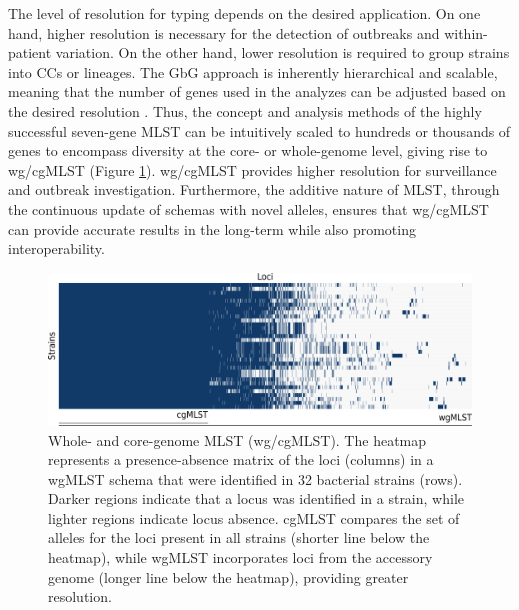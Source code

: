 The level of resolution for typing depends on the desired application. On one hand, higher resolution is necessary for the detection of outbreaks and within-patient variation. On the other hand, lower resolution is required to group strains into \ac{CC}s or lineages. The \ac{GbG} approach is inherently hierarchical and scalable, meaning that the number of genes used in the analyzes can be adjusted based on the desired resolution \cite{maiden_mlst_2013}. Thus, the concept and analysis methods of the highly successful seven-gene \ac{MLST} can be intuitively scaled to hundreds or thousands of genes to encompass diversity at the core- or whole-genome level, giving rise to \ac{wg/cgMLST} (Figure \ref{fig:introduction_figure8}). \ac{wg/cgMLST} provides higher resolution for surveillance and outbreak investigation. Furthermore, the additive nature of \ac{MLST}, through the continuous update of schemas with novel alleles, ensures that \ac{wg/cgMLST} can provide accurate results in the long-term while also promoting interoperability.

\begin{figure}[h!]
    \centering
    \includegraphics[angle=0,width=\textwidth]{figures/introduction/Figure8.pdf}
    \caption[Whole- and core-genome MLST]{Whole- and core-genome \ac{MLST} (\ac{wg/cgMLST}). The heatmap represents a presence-absence matrix of the loci (columns) in a wgMLST schema that were identified in 32 bacterial strains (rows). Darker regions indicate that a locus was identified in a strain, while lighter regions indicate locus absence. \ac{cgMLST} compares the set of alleles for the loci present in all strains (shorter line below the heatmap), while \ac{wgMLST} incorporates loci from the accessory genome (longer line below the heatmap), providing greater resolution.}
    \label{fig:introduction_figure8}
\end{figure}

